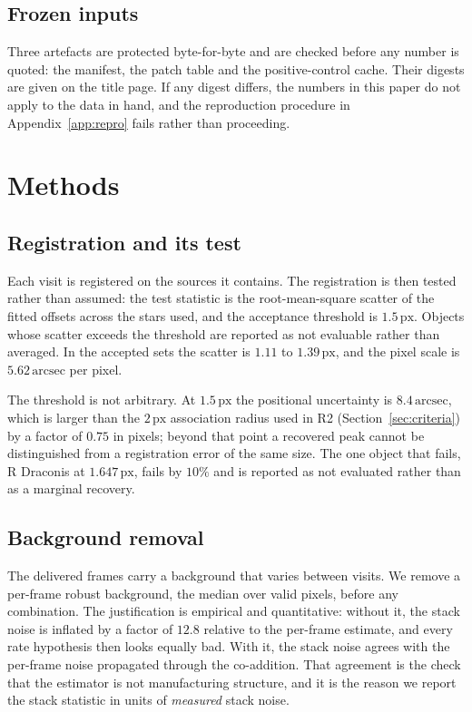 \documentclass[11pt,a4paper]{article}
\newcommand{\unit}[1]{\,\mathrm{#1}}
\newcommand{\arcsec}{\unit{arcsec}}
\newcommand{\px}{\unit{px}}
\begin{document}
\subsection{Frozen inputs}
Three artefacts are protected byte-for-byte and are checked before any number is
quoted: the manifest, the patch table and the positive-control cache. Their
digests are given on the title page. If any digest differs, the numbers in this
paper do not apply to the data in hand, and the reproduction procedure in
Appendix~\ref{app:repro} fails rather than proceeding.

\section{Methods}\label{sec:methods}

\subsection{Registration and its test}
Each visit is registered on the sources it contains. The registration is then
tested rather than assumed: the test statistic is the root-mean-square scatter of
the fitted offsets across the stars used, and the acceptance threshold is
$1.5\px$. Objects whose scatter exceeds the threshold are reported as not
evaluable rather than averaged. In the accepted sets the scatter is $1.11$ to
$1.39\px$, and the pixel scale is $5.62\arcsec$ per pixel.

The threshold is not arbitrary. At $1.5\px$ the positional uncertainty is
$8.4\arcsec$, which is larger than the $2\px$ association radius used in R2
(Section~\ref{sec:criteria}) by a factor of $0.75$ in pixels; beyond that point a
recovered peak cannot be distinguished from a registration error of the same
size. The one object that fails, R Draconis at $1.647\px$, fails by $10\%$ and is
reported as not evaluated rather than as a marginal recovery.

\subsection{Background removal}
The delivered frames carry a background that varies between visits. We remove a
per-frame robust background, the median over valid pixels, before any
combination. The justification is empirical and quantitative: without it, the
stack noise is inflated by a factor of $12.8$ relative to the per-frame estimate,
and every rate hypothesis then looks equally bad. With it, the stack noise agrees
with the per-frame noise propagated through the co-addition. That agreement is the
check that the estimator is not manufacturing structure, and it is the reason we
report the stack statistic in units of \emph{measured} stack noise.
\end{document}
